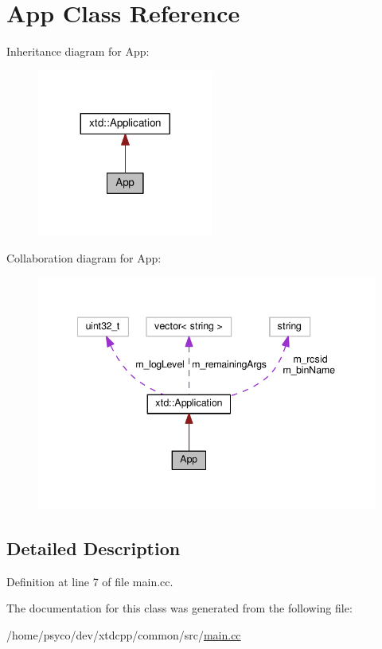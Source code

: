 \hypertarget{classApp}{}\section{App Class Reference}
\label{classApp}


Inheritance diagram for App\+:
\nopagebreak
\begin{figure}[H]
\begin{center}
\leavevmode
\includegraphics[width=164pt]{classApp__inherit__graph}
\end{center}
\end{figure}


Collaboration diagram for App\+:
\nopagebreak
\begin{figure}[H]
\begin{center}
\leavevmode
\includegraphics[width=341pt]{classApp__coll__graph}
\end{center}
\end{figure}


\subsection{Detailed Description}


Definition at line 7 of file main.\+cc.



The documentation for this class was generated from the following file\+:\begin{DoxyCompactItemize}
\item 
/home/psyco/dev/xtdcpp/common/src/\hyperlink{main_8cc}{main.\+cc}\end{DoxyCompactItemize}
